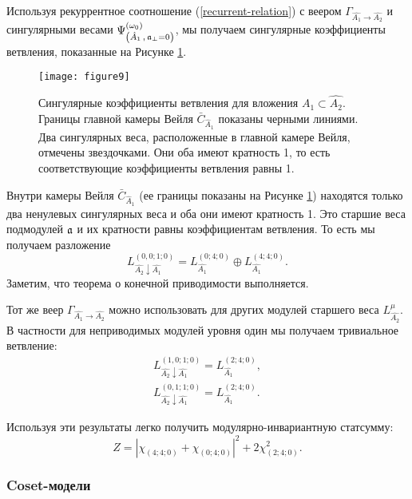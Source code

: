 Используя рекуррентное соотношение  (\ref{recurrent-relation}) с веером
$\Gamma_{\hat{A_1}\rightarrow \hat{A_2}}$ и сингулярными весами $\Psi ^{\left( \omega_0 \right) }_{\left(  \hat A_1\, , \, \mathfrak{a}_{\perp}=0 \right)}$, мы получаем сингулярные коэффициенты ветвления, показанные на Рисунке \ref{fig:AffineA2_A1_branching}.
\begin{figure}[h!tb]
  \centering
  \texttt{[image: figure9]}
  \caption{Сингулярные коэффициенты ветвления для вложения $\hat{A_1}\subset \hat{A_2}$. Границы главной камеры Вейля $\bar{C}_{\hat{A}_1}$ показаны черными линиями. Два сингулярных веса, расположенные в главной камере Вейля, отмечены звездочками. Они оба имеют кратность 1, то есть соответствующие коэффициенты ветвления равны 1.}
  \label{fig:AffineA2_A1_branching}
\end{figure}
Внутри камеры Вейля $\bar{C}_{\hat{A}_1}$ (ее границы показаны на Рисунке \ref{fig:AffineA2_A1_branching}) находятся только два ненулевых сингулярных веса и оба они имеют кратность 1. Это старшие веса подмодулей $\mathfrak{a}$ и их кратности равны коэффициентам ветвления. То есть мы получаем разложение
\begin{equation*}
  \label{eq:43}
  L^{(0,0;1;0)}_{\hat{A_2}\downarrow \hat{A_1}}= L_{\hat{A_1}}^{(0;4;0)}\oplus L_{\hat{A_1}}^{(4;4;0)}.
\end{equation*}
Заметим, что теорема о конечной приводимости выполняется.

Тот же веер $\Gamma_{\hat{A_1}\rightarrow \hat{A_2}}$ можно использовать для других модулей старшего веса $L^{\mu}_{\hat{A_2}}$. В частности для неприводимых модулей уровня один мы получаем тривиальное ветвление:
\begin{eqnarray*}
  \label{eq:44}
   L^{(1,0;1;0)}_{\hat{A_2}\downarrow \hat{A_1}}= L_{\hat{A_1}}^{(2;4;0)},\\
   L^{(0,1;1;0)}_{\hat{A_2}\downarrow \hat{A_1}}= L_{\hat{A_1}}^{(2;4;0)}.
\end{eqnarray*}

Используя эти результаты легко получить модулярно-инвариантную статсумму:
\begin{equation*}
  \label{eq:45}
  Z=\left|\chi_{(4;4;0)}+\chi_{(0;4;0)}\right|^2+2\chi_{(2;4;0)}^2.
\end{equation*}

\subsubsection{Coset-модели}
\label{sec:coset-models}

